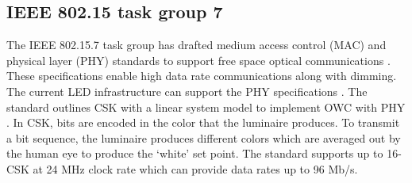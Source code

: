 \subsection{IEEE 802.15 task group 7}
\label{relatedStandard}
The IEEE 802.15.7 task group has drafted medium access control (MAC) and physical layer (PHY) standards to support free space optical communications \cite{IEEE802.15.7}. These specifications enable high data rate communications along with dimming. The current LED infrastructure can support the PHY specifications \cite{raj12a}. The standard outlines CSK with a linear system model to implement OWC with PHY . In CSK, bits are encoded in the color that the luminaire produces. To transmit a bit sequence, the luminaire produces different colors which are averaged out by the human eye to produce the `white' set point. The standard supports up to 16-CSK at 24 MHz clock rate which can provide data rates up to 96 Mb/s.
